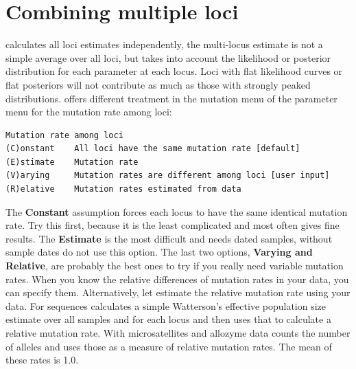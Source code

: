 \section{Combining multiple loci}
\migrate calculates all loci estimates independently, the multi-locus estimate is not a simple average over all loci, but takes into account the likelihood or posterior distribution for each parameter at each locus. Loci with flat likelihood curves or flat posteriors will not contribute as much as those with strongly peaked distributions. \migrate offers different treatment in the mutation menu of the parameter menu for the mutation rate among loci:
\begin{center}
\begin{minipage}[c]{12cm}
\begin{verbatim}
Mutation rate among loci
(C)onstant    All loci have the same mutation rate [default]
(E)stimate    Mutation rate 
(V)arying     Mutation rates are different among loci [user input]
(R)elative    Mutation rates estimated from data
\end{verbatim}
\end{minipage}
\end{center}
The {\textbf{Constant}} assumption forces each locus to have the same identical mutation rate. Try this first, because it is the least complicated and most often gives fine results. The {\textbf{Estimate}} is the most difficult and needs dated samples, without sample dates do not use this option.
The last two options, {\textbf{Varying and Relative}}, are probably the best ones to try if you really need variable mutation rates. When you know the relative differences of mutation rates in your data, you can specify them. Alternatively, let \migrate estimate the relative mutation rate using your data. For sequences \migrate calculates a simple Watterson's effective population size estimate over all samples and for each locus and then uses that to calculate a relative mutation rate. With microsatellites and allozyme data \migrate counts the number of alleles and uses those as a measure of relative mutation rates. The mean of these rates is 1.0.
\newpage
